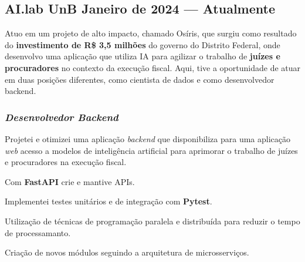 \documentclass[a4paper,12pt]{article}
\begin{document}



\subsection*{\large AI.lab UnB \hfill Janeiro de 2024 --- Atualmente}


Atuo em um projeto de alto impacto, chamado Osíris, que surgiu como resultado do \textbf{investimento de R\$ 3,5
milhões} do governo do Distrito Federal, onde desenvolvo uma aplicação que utiliza IA
para agilizar o trabalho de \textbf{juízes e procuradores} no contexto da execução fiscal. Aqui, tive a oportunidade
de atuar em duas posições diferentes, como cientista de dados e como desenvolvedor backend.

\vspace{0.5em}

\vspace{1em}

\subsubsection*{\small \textit{Desenvolvedor Backend} }
\vspace{-1em}
\vspace{-0.5em}
\begin{zitemize}
    \item Projetei e otimizei uma aplicação \textit{backend} que disponibiliza para uma aplicação \textit{web} acesso a modelos de inteligência artificial para aprimorar o trabalho de juízes e procuradores na execução fiscal.
    \item Com \textbf{FastAPI} crie e mantive APIs.
    \item Implementei testes unitários e de integração com \textbf{Pytest}.
    \item Utilização de técnicas de programação paralela e distribuída para reduzir o tempo de processamanto.
    \item Criação de novos módulos seguindo a arquitetura de microsserviços.
\end{zitemize}
\end{document}
